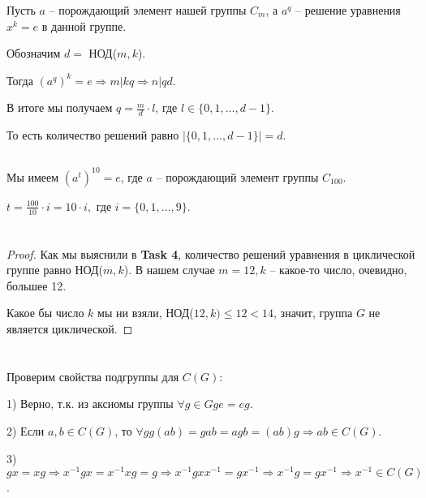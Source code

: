 \documentclass[12pt, a4paper]{article}
\theoremstyle{definition}
\begin{document}
Пусть $a$ -- порождающий элемент нашей группы $C_m$, а $a^q$ -- решение уравнения $x^k = e$ в данной группе.

Обозначим  $d = $ НОД($m, k$).

Тогда $(a^q)^k = e \Rightarrow m | kq \Rightarrow n | qd$.

В итоге мы получаем $q = \frac{m}{d} \cdot l$, где $l \in \{0, 1,..., d - 1\}$.

То есть количество решений равно $|\{0, 1,..., d - 1\}| = d$. 

\subsection{}

Мы имеем $(a^t)^10 = e$, где $a$ -- порождающий элемент группы $C_{100}$.

$t = \frac{100}{10} \cdot i = 10 \cdot i,$ где $ i = \{0, 1,..., 9\}$. 

\section{}

\begin{proof}

    Как мы выяснили в \textbf{Task 4}, количество решений уравнения в циклической группе равно НОД($m, k$). В нашем случае $m = 12, k$ -- какое-то число, очевидно, большее 12.

    Какое бы число $k$ мы ни взяли, НОД($12, k) \leq 12 < 14$, значит, группа $G$ не является циклической.

\end{proof}

\section{}

\subsection{}

Проверим свойства подгруппы для $C(G)$:

1) Верно, т.к. из аксиомы группы $\forall g \in G ge = eg$.

2) Если $a, b \in C(G)$, то $\forall g g(ab) = gab = agb = (ab)g \Rightarrow ab \in C(G)$.  

3) $gx = xg \Rightarrow x^{-1}gx = x^{-1}xg = g \Rightarrow x^{-1}gxx^{-1} = gx^{-1} \Rightarrow x^{-1}g = gx^{-1} \Rightarrow x^{-1} \in C(G)$.
\end{document}
